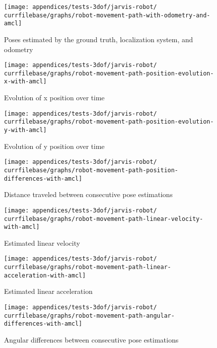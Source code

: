 \begin{figure}[H]
	\centering
	\texttt{[image: appendices/tests-3dof/jarvis-robot/\\currfilebase/graphs/robot-movement-path-with-odometry-and-amcl]}
	\caption{Poses estimated by the ground truth, localization system,  and odometry}
\end{figure}

\begin{figure}[H]
	\centering
	\texttt{[image: appendices/tests-3dof/jarvis-robot/\\currfilebase/graphs/robot-movement-path-position-evolution-x-with-amcl]}
	\caption{Evolution of x position over time}
\end{figure}

\begin{figure}[H]
	\centering
	\texttt{[image: appendices/tests-3dof/jarvis-robot/\\currfilebase/graphs/robot-movement-path-position-evolution-y-with-amcl]}
	\caption{Evolution of y position over time}
\end{figure}


\begin{figure}[H]
	\centering
	\texttt{[image: appendices/tests-3dof/jarvis-robot/\\currfilebase/graphs/robot-movement-path-position-differences-with-amcl]}
	\caption{Distance traveled between consecutive pose estimations}
\end{figure}

\begin{figure}[H]
	\centering
	\texttt{[image: appendices/tests-3dof/jarvis-robot/\\currfilebase/graphs/robot-movement-path-linear-velocity-with-amcl]}
	\caption{Estimated linear velocity}
\end{figure}

\begin{figure}[H]
	\centering
	\texttt{[image: appendices/tests-3dof/jarvis-robot/\\currfilebase/graphs/robot-movement-path-linear-acceleration-with-amcl]}
	\caption{Estimated linear acceleration}
\end{figure}


\begin{figure}[H]
	\centering
	\texttt{[image: appendices/tests-3dof/jarvis-robot/\\currfilebase/graphs/robot-movement-path-angular-differences-with-amcl]}
	\caption{Angular differences between consecutive pose estimations}
\end{figure}

